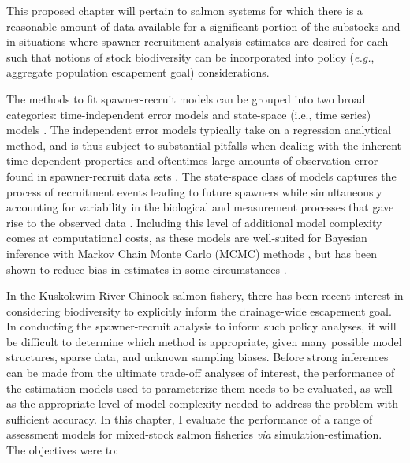 \documentclass[12pt,]{book}
\theoremstyle{definition}
\theoremstyle{definition}
\theoremstyle{definition}
\theoremstyle{remark}
\begin{document}
\noindent
This proposed chapter will pertain to salmon systems for which there is
a reasonable amount of data available for a significant portion of the
substocks and in situations where spawner-recruitment analysis estimates
are desired for each such that notions of stock biodiversity can be
incorporated into policy (\emph{e.g.}, aggregate population escapement
goal) considerations.

The methods to fit spawner-recruit models can be grouped into two broad
categories: time-independent error models
\citep[\emph{e.g.},][]{clark-etal-2009} and state-space (i.e., time
series) models
\citep[\emph{e.g.},][]{fleischman-etal-2013, su-peterman-2012}. The
independent error models typically take on a regression analytical
method, and is thus subject to substantial pitfalls when dealing with
the inherent time-dependent properties and oftentimes large amounts of
observation error found in spawner-recruit data sets
\citep{walters-martell-2004}. The state-space class of models captures
the process of recruitment events leading to future spawners while
simultaneously accounting for variability in the biological and
measurement processes that gave rise to the observed data
\citep{devalpine-hastings-2002, fleischman-etal-2013}. Including this
level of additional model complexity comes at computational costs, as
these models are well-suited for Bayesian inference with Markov Chain
Monte Carlo (MCMC) methods \citep[Ch. 4]{newman-etal-2014}, but has been
shown to reduce bias in estimates in some circumstances
\citep{su-peterman-2012, walters-martell-2004}.

In the Kuskokwim River Chinook salmon fishery, there has been recent
interest in considering biodiversity to explicitly inform the
drainage-wide escapement goal. In conducting the spawner-recruit
analysis to inform such policy analyses, it will be difficult to
determine which method is appropriate, given many possible model
structures, sparse data, and unknown sampling biases. Before strong
inferences can be made from the ultimate trade-off analyses of interest,
the performance of the estimation models used to parameterize them needs
to be evaluated, as well as the appropriate level of model complexity
needed to address the problem with sufficient accuracy. In this chapter,
I evaluate the performance of a range of assessment models for
mixed-stock salmon fisheries \emph{via} simulation-estimation. The
objectives were to:
\end{document}
